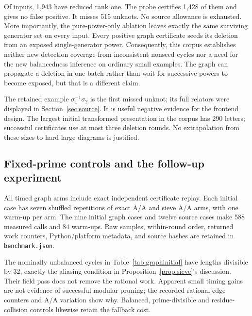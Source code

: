 \documentclass[11pt]{article}
\theoremstyle{definition}\newtheorem{definition}[theorem]{Definition}
\theoremstyle{remark}\newtheorem{remark}[theorem]{Remark}
\newcommand{\code}[1]{\texttt{#1}}
\begin{document}
Of \AuditCount{} inputs, 1,943 have reduced rank one. The probe certifies
1,428 of them and gives no false positive. It misses 515 unknots. No
source allowance is exhausted. More importantly, the pure-power-only
ablation leaves exactly the same surviving generator set on every input.
Every positive graph certificate seeds its deletion from an exposed
single-generator power. Consequently, this corpus establishes neither
new detection coverage from inconsistent nonseed cycles nor a need for
the new balancedness inference on ordinary small examples. The graph
can propagate a deletion in one batch rather than wait for successive
powers to become exposed, but that is a different claim.

The retained example $\sigma_1^{-1}\sigma_2$ is the first missed unknot;
its full relators were displayed in Section~\ref{sec:source}. It is useful
negative evidence for the frontend design. The largest initial transformed
presentation in the corpus has 290 letters; successful certificates use
at most three deletion rounds. No extrapolation from these sizes to hard
large diagrams is justified.

\subsection{Fixed-prime controls and the follow-up experiment}
All timed graph arms include exact independent certificate replay. Each
initial case has seven shuffled repetitions of exact A/A and sieve A/A
arms, with one warm-up per arm. The nine initial graph cases and twelve
source cases make 588 measured calls and 84 warm-ups. Raw samples,
within-round order, returned work counters, Python/platform metadata,
and source hashes are retained in \code{benchmark.json}.

\begin{table}[H]\centering\small

\caption{Initial graph families. Exact and sieve columns are medians;
``paired ratio'' is the median of within-round exact/sieve time ratios.
Values below one favor exact-only discovery. All times include replay.}
\label{tab:graphinitial}\end{table}
The nominally unbalanced cycles in Table~\ref{tab:graphinitial} have
lengths divisible by 32, exactly the aliasing condition in
Proposition~\ref{prop:sieve}'s discussion. Their field pass does not
remove the rational work. Apparent small timing gains are not evidence
of successful modular pruning; the recorded rational-edge counters and
A/A variation show why. Balanced, prime-divisible and residue-collision
controls likewise retain the fallback cost.
\end{document}
